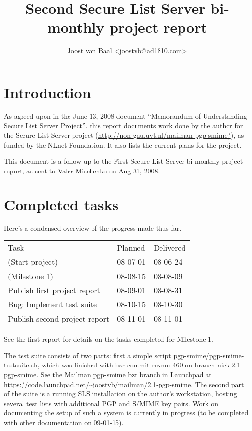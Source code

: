 \documentclass[a4]{article}
\title{Second Secure List Server bi-monthly project report}
\author{Joost van Baal \url{<joostvb@ad1810.com>}}
\begin{document}
\maketitle

\setlength{\parindent}{0pt}
\setlength{\parskip}{1.5ex}

\section*{Introduction}

As agreed upon in the June 13, 2008 document ``Memorandum of Understanding
Secure List Server Project'', this report documents work done by the author for
the Secure List Server project
(\url{http://non-gnu.uvt.nl/mailman-pgp-smime/}), as funded by the NLnet
Foundation.  It also lists the current plans for the project.

This document is a follow-up to the First Secure List Server bi-monthly project
report, as sent to Valer Mischenko on Aug 31, 2008.

\section{Completed tasks}

Here's a condensed overview of the progress made thus far.

\begin{tabular}{lll}
 Task                            & Planned  & Delivered   \\ \cline{1-3}
 (Start project)                 & 08-07-01 & 08-06-24    \\
 (Milestone 1)                   & 08-08-15 & 08-08-09    \\
 Publish first project report    & 08-09-01 & 08-08-31    \\
 Bug: Implement test suite       & 08-10-15 & 08-10-30    \\
 Publish second project report   & 08-11-01 & 08-11-01    \\
\end{tabular}

See the first report for details on the tasks completed for Milestone 1.

The test suite consists of two parts: first a simple script
pgp-smime/pgp-smime-testsuite.sh, which was finished with bzr commit revno: 460
on branch nick 2.1-pgp-smime.  See the Mailman pgp-smime bzr branch in
Launchpad at \url{https://code.launchpad.net/~joostvb/mailman/2.1-pgp-smime}.
The second part of the suite is a running SLS installation on the author's
workstation, hosting several test lists with additional PGP and S/MIME key
pairs.  Work on documenting the setup of such a system is currently in progress
(to be completed with other documentation on 09-01-15).
\end{document}
